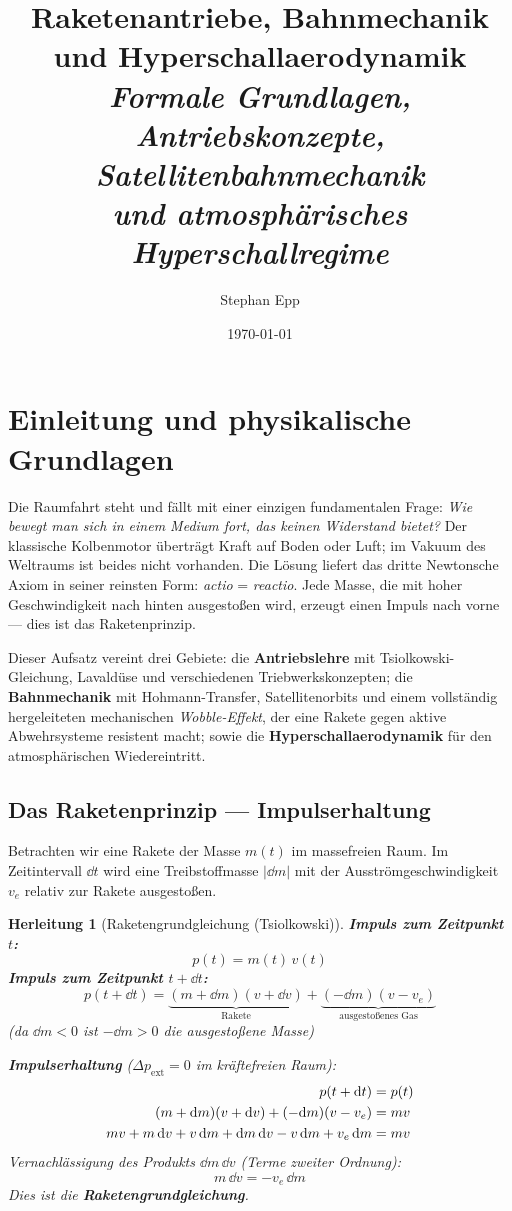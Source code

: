 ﻿\documentclass[12pt,a4paper]{article}
\title{Raketenantriebe, Bahnmechanik und Hyperschallaerodynamik\\[0.4em]
  \large\textit{Formale Grundlagen, Antriebskonzepte, Satellitenbahnmechanik\\
und atmosph\"{a}risches Hyperschallregime}}
\author{Stephan Epp}
\date{\today}
\newtheorem{herleitung}{Herleitung}[section]
\newcommand{\ve}{v_e}
\begin{document}
\maketitle

\tableofcontents
\newpage

\section{Einleitung und physikalische Grundlagen}

Die Raumfahrt steht und fällt mit einer einzigen fundamentalen Frage: \emph{Wie bewegt
man sich in einem Medium fort, das keinen Widerstand bietet?} Der klassische
Kolbenmotor überträgt Kraft auf Boden oder Luft; im Vakuum des Weltraums ist beides
nicht vorhanden. Die Lösung liefert das dritte Newtonsche Axiom in seiner reinsten
Form: \textit{actio} = \textit{reactio}. Jede Masse, die mit hoher Geschwindigkeit
nach hinten ausgestoßen wird, erzeugt einen Impuls nach vorne --- dies ist das
Raketenprinzip.

Dieser Aufsatz vereint drei Gebiete: die \textbf{Antriebslehre} mit Tsiolkowski-Gleichung,
Lavaldüse und verschiedenen Triebwerkskonzepten; die \textbf{Bahnmechanik} mit Hohmann-Transfer,
Satellitenorbits und einem vollständig hergeleiteten mechanischen \emph{Wobble-Effekt},
der eine Rakete gegen aktive Abwehrsysteme resistent macht; sowie die
\textbf{Hyperschallaerodynamik} für den atmosphärischen Wiedereintritt.

\subsection{Das Raketenprinzip --- Impulserhaltung}

Betrachten wir eine Rakete der Masse $m(t)$ im massefreien Raum. Im Zeitintervall
$\dd t$ wird eine Treibstoffmasse $|\dd m|$ mit der Ausströmgeschwindigkeit $\ve$
relativ zur Rakete ausgestoßen.

\begin{herleitung}[Raketengrundgleichung (Tsiolkowski)]
\textbf{Impuls zum Zeitpunkt $t$:}
\[
  p(t) = m(t)\,v(t)
\]
\textbf{Impuls zum Zeitpunkt $t + \dd t$:}
\[
  p(t+\dd t) = \underbrace{(m+\dd m)(v+\dd v)}_{\text{Rakete}} +
               \underbrace{(-\dd m)(v - \ve)}_{\text{ausgestoßenes Gas}}
\]
(da $\dd m < 0$ ist $-\dd m > 0$ die ausgestoßene Masse)

\textbf{Impulserhaltung} ($\Delta p_{\text{ext}} = 0$ im kräftefreien Raum):
\begin{align}
  p(t+\dd t) &= p(t) \notag\\
  (m+\dd m)(v+\dd v) + (-\dd m)(v-\ve) &= mv \notag\\
  mv + m\,\dd v + v\,\dd m + \dd m\,\dd v - v\,\dd m + \ve\,\dd m &= mv \notag
\end{align}
Vernachlässigung des Produkts $\dd m\,\dd v$ (Terme zweiter Ordnung):
\[
  \boxed{m\,\dd v = -\ve\,\dd m}
\]
Dies ist die \textbf{Raketengrundgleichung}.
\end{herleitung}
\end{document}

